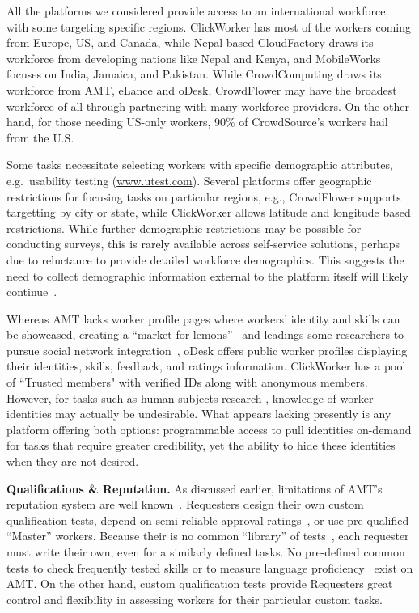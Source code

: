 \documentclass{sigchi}
\begin{document}
All the platforms we considered provide access to an international workforce, with some targeting specific regions. ClickWorker has most of the workers coming from Europe, US, and Canada, while Nepal-based CloudFactory draws its workforce from developing nations like Nepal and Kenya, and MobileWorks focuses on India, Jamaica, and Pakistan. While CrowdComputing draws its workforce from AMT, eLance and oDesk, CrowdFlower may have the broadest workforce of all through partnering with many workforce providers. On the other hand, for those needing US-only workers, 90\% of CrowdSource's workers hail from the U.S. 

Some tasks necessitate selecting workers with specific demographic attributes, e.g.\ usability testing (\url{www.utest.com}). Several platforms offer geographic restrictions for focusing tasks on particular regions, e.g., CrowdFlower supports targetting by city or state, while ClickWorker allows latitude and longitude based restrictions. While further demographic restrictions may be possible for conducting surveys, this is rarely available across self-service solutions, perhaps due to reluctance to provide detailed workforce demographics. This suggests the need to collect demographic information external to the platform itself will likely continue~\cite{Ross10,ipeirotis2010demographics}.  

Whereas AMT lacks worker profile pages where workers' identity and skills can be showcased, creating a ``market for lemons''~\cite{Ipeirotis-lemons} and leadings some researchers to pursue social network integration~\cite{difallah13},
oDesk offers public worker profiles displaying their identities, skills, feedback, and ratings information. ClickWorker has a pool of ``Trusted members" with verified IDs along with anonymous members. However, for tasks such as human subjects research \cite{mason2012conducting}, knowledge of worker identities may actually be undesirable. What appears lacking presently is any platform offering both options: programmable access to pull identities on-demand for tasks that require greater credibility, yet the ability to hide these identities when they are not desired. 



{\bf Qualifications \& Reputation.} As discussed earlier, limitations of AMT's reputation system are well known~\cite{panos2010pleatoamazon}. Requesters design their own custom qualification tests, depend on semi-reliable approval ratings~\cite{ipeirotis-be-a-top-worker}, or use pre-qualified ``Master'' workers. Because their is no common ``library'' of tests~\cite{chen2011opportunities}, each requester must write their own, even for a similarly defined tasks. No pre-defined common tests to check frequently tested skills or to measure language proficiency~\cite{mellebeek2010opinion} exist on AMT. On the other hand, custom qualification tests provide Requesters great control and flexibility in assessing workers for their particular custom tasks. 
\end{document}
